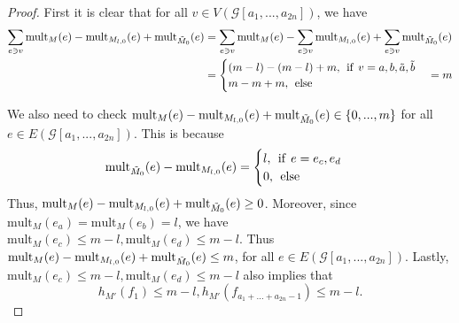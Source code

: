 \documentclass[11pt]{amsart}
\theoremstyle{definition}
\theoremstyle{remark}
\numberwithin{equation}{section}
\begin{document}
\begin{proof}
    First it is clear that for all $v\in V(\mathcal{G}[a_1,...,a_{2n}])$, we have
    \begin{equation*}
        \begin{split}
            \sum_{e\ni v}\text{mult}_{M}(e) - \text{mult}_{M_{l,0}}(e) + \text{mult}_{\Tilde{M}_0}(e) &= \sum_{e\ni v}\text{mult}_{M}(e) - \sum_{e\ni v}\text{mult}_{M_{l,0}}(e) + \sum_{e\ni v}\text{mult}_{\Tilde{M}_0}(e)\\
            &= \begin{cases}
                (m-l)-(m-l) + m, \:\:\text{if}\:\:v=a,b,\tilde{a},\tilde{b}\\
                m - m + m,\:\:\text{else}\\
            \end{cases}
            = m\\
        \end{split}
    \end{equation*}

    We also need to check $\text{mult}_{M}(e) - \text{mult}_{M_{l,0}}(e) + \text{mult}_{\Tilde{M}_0}(e)\in \{0,...,m\}$ for all $e\in E(\mathcal{G}[a_1,...,a_{2n}])$. This is because $$\text{mult}_{\Tilde{M}_0}(e)- \text{mult}_{M_{l,0}}(e)=\begin{cases}
        l, \:\:\text{if}\:\:e=e_c,e_d\\
       0,\:\:\text{else}\\
    \end{cases}$$
    Thus, $\text{mult}_{M}(e) - \text{mult}_{M_{l,0}}(e) + \text{mult}_{\Tilde{M}_0}(e)\geq 0$. Moreover, since $\text{mult}_{M}(e_a)=\text{mult}_{M}(e_b) = l$, we have $\text{mult}_{M}(e_c)\leq m-l, \text{mult}_{M}(e_d)\leq m-l$. Thus $\text{mult}_{M}(e) - \text{mult}_{M_{l,0}}(e) + \text{mult}_{\Tilde{M}_0}(e)\leq m$, for all $e\in E(\mathcal{G}[a_1,...,a_{2n}])$. Lastly, $\text{mult}_{M}(e_c)\leq m-l, \text{mult}_{M}(e_d)\leq m-l$ also implies that \[h_{M'}(f_1)\leq m-l, h_{M'}(f_{a_1+...+a_{2n}-1})\leq m-l.\] 


\end{proof}
\end{document}

